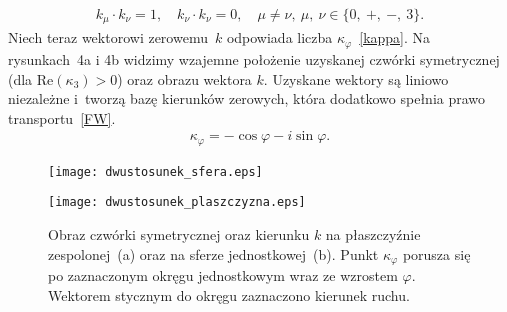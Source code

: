 \begin{align*}
k_\mu \cdot k_\nu = 1 , 
\quad k_\nu \cdot k_\nu = 0,\quad \mu \neq \nu ,\ 
\mu,\ \nu \in \{0,\ +,\ -,\ 3\}.
\end{align*} 
Niech teraz wektorowi zerowemu~$k$ odpowiada 
liczba $\kappa_\varphi$~\eqref{kappa}.
Na rysunkach~4a i 4b
widzimy wzajemne położenie 
uzyskanej czwórki symetrycznej (dla Re$ (\kappa_3) >0$) 
oraz obrazu wektora $k$. 
Uzyskane wektory są liniowo niezależne i~tworzą bazę 
kierunków zerowych, która dodatkowo spełnia 
prawo transportu~\eqref{FW}.
\begin{align}\label{kappa}
\kappa_\varphi = -\cos\varphi - i \sin \varphi .
\end{align}
\begin{figure}[h]
\begin{minipage}[b]{.5\linewidth}
\centering
\texttt{[image: dwustosunek\_sfera.eps]}
\subcaption{}
\end{minipage}%
\begin{minipage}[b]{.5\linewidth}
\centering
\texttt{[image: dwustosunek\_plaszczyzna.eps]}
\subcaption{}
\end{minipage}
\caption{Obraz czwórki symetrycznej oraz kierunku $k$ na płaszczyźnie 
zespolonej~(a) oraz na sferze jednostkowej~(b).
Punkt $\kappa_\varphi$ porusza się po zaznaczonym okręgu jednostkowym 
wraz ze wzrostem $\varphi$. Wektorem stycznym do okręgu zaznaczono 
kierunek ruchu.}
\label{dwustosunek_plaszczyzna}
\end{figure}
\\

